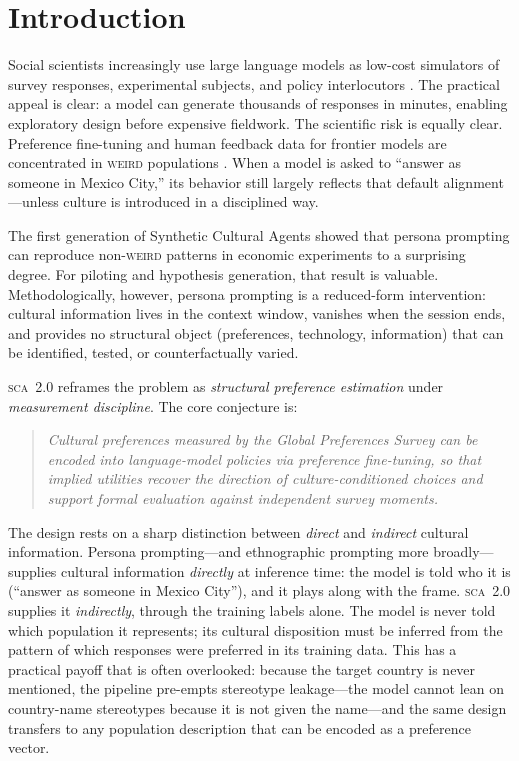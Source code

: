 \documentclass[11pt,letterpaper]{article}
\newcommand{\SCA}{\textsc{sca}}
\newcommand{\WEIRD}{\textsc{weird}}
\begin{document}
\section{Introduction}

Social scientists increasingly use large language models as low-cost simulators of survey responses, experimental subjects, and policy interlocutors \cite{horton2023,achar2023,argyle2023}. The practical appeal is clear: a model can generate thousands of responses in minutes, enabling exploratory design before expensive fieldwork. The scientific risk is equally clear. Preference fine-tuning and human feedback data for frontier models are concentrated in \WEIRD{} populations \cite{henrich2010,falk2018}. When a model is asked to ``answer as someone in Mexico City,'' its behavior still largely reflects that default alignment---unless culture is introduced in a disciplined way.

The first generation of Synthetic Cultural Agents \cite{capra2025} showed that persona prompting can reproduce non-\WEIRD{} patterns in economic experiments to a surprising degree. For piloting and hypothesis generation, that result is valuable. Methodologically, however, persona prompting is a reduced-form intervention: cultural information lives in the context window, vanishes when the session ends, and provides no structural object (preferences, technology, information) that can be identified, tested, or counterfactually varied.

\SCA{}~2.0 reframes the problem as \emph{structural preference estimation} under \emph{measurement discipline}. The core conjecture is:

\begin{quote}
\textit{Cultural preferences measured by the Global Preferences Survey can be encoded into language-model policies via preference fine-tuning, so that implied utilities recover the direction of culture-conditioned choices and support formal evaluation against independent survey moments.}
\end{quote}

The design rests on a sharp distinction between \emph{direct} and \emph{indirect} cultural information. Persona prompting---and ethnographic prompting more broadly---supplies cultural information \emph{directly} at inference time: the model is told who it is (``answer as someone in Mexico City''), and it plays along with the frame. \SCA{}~2.0 supplies it \emph{indirectly}, through the training labels alone. The model is never told which population it represents; its cultural disposition must be inferred from the pattern of which responses were preferred in its training data. This has a practical payoff that is often overlooked: because the target country is never mentioned, the pipeline pre-empts stereotype leakage---the model cannot lean on country-name stereotypes because it is not given the name---and the same design transfers to any population description that can be encoded as a preference vector.
\end{document}
